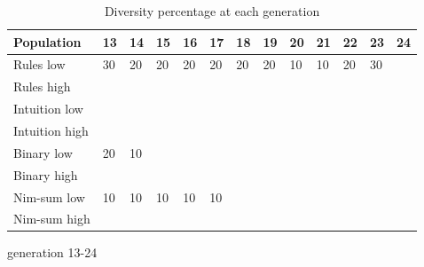\begin{table}
	\medskip
	\begin{subtable}{\linewidth}
	\centering
		\begin{tabular}{lllllllllllll}\hline
		Population & 13 & 14 & 15 & 16 & 17 & 18 & 19 & 20 & 21 & 22 & 23 & 24\\\hline
		Rules low & 30 & 20 & 20 & 20 & 20 & 20 & 20 & 10 & 10 & 20 & 30 & \textemdash\\
		Rules high & \textemdash & \textemdash & \textemdash & \textemdash & \textemdash & \textemdash & \textemdash & \textemdash & \textemdash & \textemdash & \textemdash & \textemdash\\
		Intuition low & \textemdash & \textemdash & \textemdash & \textemdash & \textemdash & \textemdash & \textemdash & \textemdash & \textemdash & \textemdash & \textemdash & \textemdash\\
		Intuition high & \textemdash & \textemdash & \textemdash & \textemdash & \textemdash & \textemdash & \textemdash & \textemdash & \textemdash & \textemdash & \textemdash & \textemdash\\
		Binary low & 20 & 10 & \textemdash & \textemdash & \textemdash & \textemdash & \textemdash & \textemdash & \textemdash & \textemdash & \textemdash & \textemdash\\
		Binary high & \textemdash & \textemdash & \textemdash & \textemdash & \textemdash & \textemdash & \textemdash & \textemdash & \textemdash & \textemdash & \textemdash & \textemdash\\
		Nim-sum low & 10 & 10 & 10 & 10 & 10 & \textemdash & \textemdash & \textemdash & \textemdash & \textemdash & \textemdash & \textemdash\\
		Nim-sum high & \textemdash & \textemdash & \textemdash & \textemdash & \textemdash & \textemdash & \textemdash & \textemdash & \textemdash & \textemdash & \textemdash & \textemdash\\	
		\end{tabular}
	\caption{generation 13-24}
	\end{subtable}
	\caption{Diversity percentage at each generation}
	\label{tab:results_diversity}
\end{table}

